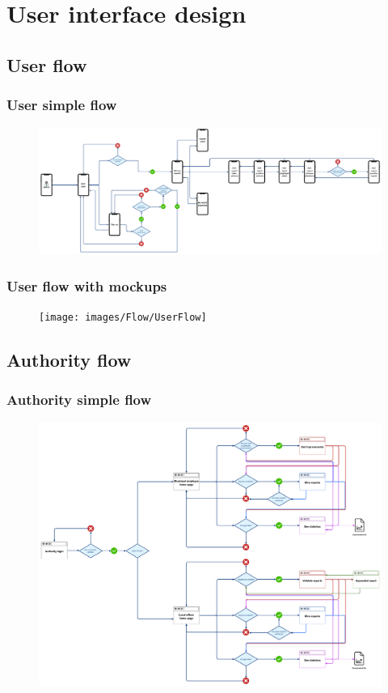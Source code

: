 	\chapter{User interface design}
		\section{User flow}
			\subsection{User simple flow}
			\begin{figure}[!h]
				\centering
				\includegraphics[width=\textwidth]{images/Flow/UserSimpleFlow}
			\end{figure}
			\subsection{User flow with mockups}
			\begin{figure}[!h]
				\centering
				\texttt{[image: images/Flow/UserFlow]}
			\end{figure}
		\section{Authority flow}
			\subsection{Authority simple flow}
			\begin{figure}[!h]
				\centering
				\includegraphics[width=\textwidth]{images/Flow/AuthoritySimpleFlow}
			\end{figure}
